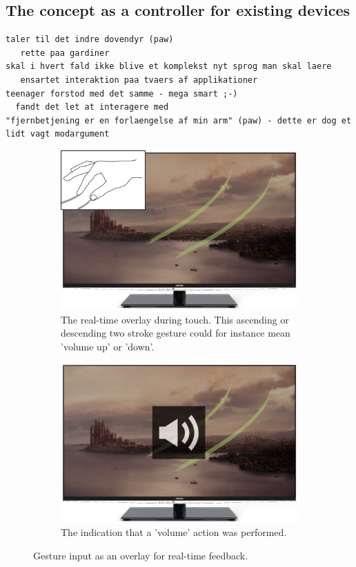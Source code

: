 \subsection{The concept as a controller for existing devices}
\todo{\dots}
\blank
\begin{verbatim}
taler til det indre dovendyr (paw)
   rette paa gardiner
skal i hvert fald ikke blive et komplekst nyt sprog man skal laere
   ensartet interaktion paa tvaers af applikationer
teenager forstod med det samme - mega smart ;-)
  fandt det let at interagere med
"fjernbetjening er en forlaengelse af min arm" (paw) - dette er dog et lidt vagt modargument
\end{verbatim}

\begin{figure}[h]
  \centering
  \begin{subfigure}[t]{.45\textwidth}
    \centering
    \includegraphics[width=.9\linewidth]{figures/touch/evaluation/gesture_overlay}
    \caption{The real-time overlay during touch. This ascending or descending two stroke gesture could for instance mean 'volume up' or 'down'.}
  \end{subfigure}%
  \hspace{1cm}
  \begin{subfigure}[t]{.45\textwidth}
    \centering
    \includegraphics[width=.9\linewidth]{figures/touch/evaluation/gesture_overlay_2}
    \caption{The indication that a 'volume' action was performed.}
  \end{subfigure}
  \caption{Gesture input as an overlay for real-time feedback.}
  \label{fig:textiletouch:eval:overlay}
\end{figure}

